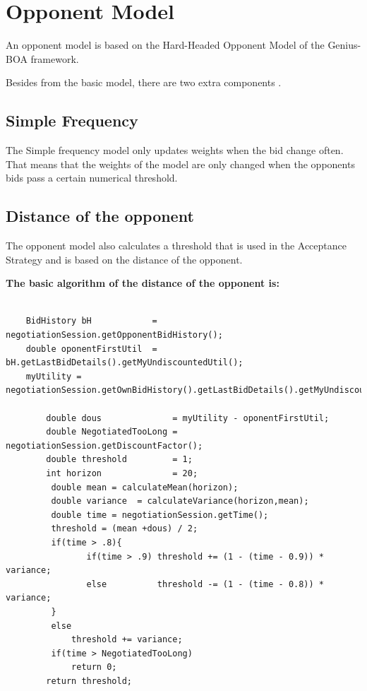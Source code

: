 \documentclass[html]{report}    %
\begin{document}
\section{Opponent Model}  

An opponent model is based on the Hard-Headed Opponent Model of the Genius-BOA framework.

Besides from the basic model, there are two extra components .~\cite{anac2013}

\subsection{Simple Frequency}

The Simple frequency model only updates weights when the bid change often.
That means that the weights of the model are only changed when the opponents bids pass a certain numerical threshold.

\subsection{Distance of the opponent}

The opponent model also calculates a threshold that is used in the Acceptance Strategy and is based on the distance of the opponent.

\textbf{ The basic algorithm of the distance of the opponent is:}

\begin{verbatim}

	BidHistory bH            = negotiationSession.getOpponentBidHistory();
	double oponentFirstUtil  = bH.getLastBidDetails().getMyUndiscountedUtil();
    myUtility = negotiationSession.getOwnBidHistory().getLastBidDetails().getMyUndiscountedUtil();
	    
	    double dous              = myUtility - oponentFirstUtil; 
	    double NegotiatedTooLong = negotiationSession.getDiscountFactor();
	    double threshold         = 1;    
	    int horizon              = 20;    
	     double mean = calculateMean(horizon);
	     double variance  = calculateVariance(horizon,mean);
	     double time = negotiationSession.getTime();
	     threshold = (mean +dous) / 2;
	     if(time > .8){
	        	if(time > .9) threshold += (1 - (time - 0.9)) * variance;
	        	else          threshold -= (1 - (time - 0.8)) * variance;
	     }
	     else
	         threshold += variance;
	     if(time > NegotiatedTooLong)
	         return 0;
	    return threshold;
\end{verbatim}
\end{document}
